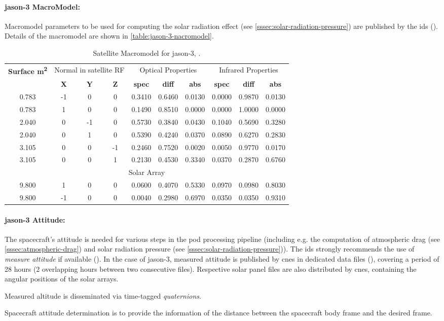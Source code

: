 \paragraph{\gls{jason}-3 MacroModel:}
Macromodel parameters to be used for computing 
the solar radiation effect (see \autoref{sssec:solar-radiation-pressure}) are published by the \gls{ids} 
(\cite{Cerri2022}). Details of the macromodel are shown in \autoref{table:jason-3-nacromodel}.
\begin{table}[h!]
    \centering
    \begin{tabular}{cccccccccc}
        \toprule
        \textbf{Surface \si{\meter\tothe{2}}} & 
            \multicolumn{3}{c}{Normal in satellite RF} &
            \multicolumn{3}{c}{Optical Properties} &
            \multicolumn{3}{c}{Infrared Properties} \\
         & 
         \textbf{X} & \textbf{Y} & \textbf{Z} &
         \textbf{spec} & \textbf{diff} & \textbf{abs} &
         \textbf{spec} & \textbf{diff} & \textbf{abs} \\
        \hline
        0.783& -1&   0&  0& 0.3410& 0.6460& 0.0130& 0.0000& 0.9870& 0.0130 \\
        0.783&  1 &  0&  0& 0.1490& 0.8510& 0.0000& 0.0000& 1.0000& 0.0000 \\
        2.040&  0 & -1&  0& 0.5730& 0.3840& 0.0430& 0.1040& 0.5690& 0.3280 \\
        2.040&  0 &  1&  0& 0.5390& 0.4240& 0.0370& 0.0890& 0.6270& 0.2830 \\
        3.105&  0 &  0& -1& 0.2460& 0.7520& 0.0020& 0.0050& 0.9770& 0.0170 \\
        3.105&  0 &  0&  1& 0.2130& 0.4530& 0.3340& 0.0370& 0.2870& 0.6760 \\
        \multicolumn{10}{c}{Solar Array} \\
        9.800&  1& 0& 0& 0.0600& 0.4070& 0.5330& 0.0970& 0.0980& 0.8030 \\
        9.800& -1& 0& 0& 0.0040& 0.2980& 0.6970& 0.0350& 0.0350& 0.9310 \\
       \bottomrule
    \end{tabular}
    \caption{Satellite Macromodel for \gls{jason}-3, \cite{Cerri2022}.}
    \label{table:jason-3-nacromodel}
\end{table}

\paragraph{\gls{jason}-3 Attitude:}
The spacecraft's attitude is needed for various steps in the \gls{pod} processing 
pipeline (including e.g. the computation of atmospheric drag (see 
\autoref{sssec:atmospheric-drag}) and solar radiation pressure (see 
\autoref{sssec:solar-radiation-pressure})). The \gls{ids} strongly recommends the 
use of \emph{measure attitude} if available (\cite{IdsRecommendationItrf2020}). In 
the case of \gls{jason}-3, measured attitude is published by \gls{cnes} in dedicated 
data files (\cite{Ferrage2020}), covering a period of 28 hours (2 overlapping hours 
between two consecutive files). Respective solar panel files are also distributed 
by \gls{cnes}, containing the angular positions of the solar arrays.

Measured altitude is disseminated via time-tagged \emph{quaternions}. 

Spacecraft attitude determination is to provide the information of the distance 
between the spacecraft body frame and the desired frame.
